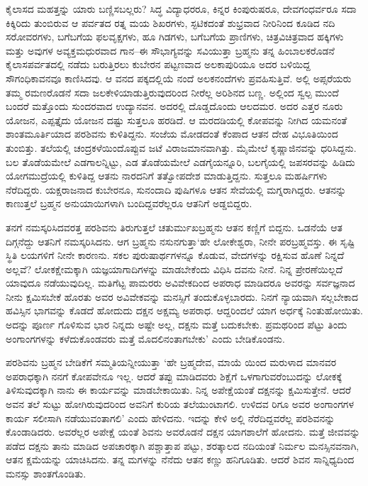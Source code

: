 ಕೈಲಾಸದ ಮಹತ್ತನ್ನು ಯಾರು ಬಣ್ಣಿಸಬಲ್ಲರು? ಸಿದ್ಧ ವಿದ್ಯಾಧರರೂ, ಕಿನ್ನರ ಕಿಂಪುರುಷರೂ, ದೇವಗಂಧರ್ವರೂ ಸದಾ ಕಿಕ್ಕಿರಿದು ತುಂಬಿರುವ ಆ ಪರ್ವತದ ರತ್ನ ಮಯ ಶಿಖರಗಳು, ಸ್ಫಟಿಕದಂತೆ ಶುಭ್ರವಾದ ನೀರಿನಿಂದ ಕೂಡಿದ ನದಿ ಸರೋವರಗಳು, ಬಗೆಬಗೆಯ ಫಲವೃಕ್ಷಗಳು, ಹೂ ಗಿಡಗಳು, ಬಗೆಬಗೆಯ ಪ್ರಾಣಿಗಳು, ಚಿತ್ರವಿಚಿತ್ರವಾದ ಹಕ್ಕಿಗಳು ಮತ್ತು ಅವುಗಳ ಅವ್ಯಕ್ತಮಧುರವಾದ ಗಾನ–ಈ ಸೌಭಾಗ್ಯವನ್ನು ಸವಿಯುತ್ತಾ ಬ್ರಹ್ಮನು ತನ್ನ ಹಿಂಬಾಲಕರೊಡನೆ ಕೈಲಾಸಪರ್ವತದಲ್ಲಿ ನಡೆದು ಬರುತ್ತಿರಲು ಕುಬೇರನ ಪಟ್ಟಣವಾದ ಅಲಕಾಪುರಿಯೂ ಅದರ ಬಳಿಯಿದ್ದ ಸೌಗಂಧಿಕಾವನವೂ ಕಾಣಿಸಿದವು. ಆ ವನದ ಪಕ್ಕದಲ್ಲಿಯೆ ನಂದೆ ಅಲಕನಂದೆಗಳು ಪ್ರವಹಿಸುತ್ತಿವೆ. ಅಲ್ಲಿ ಅಪ್ಸರೆಯರು ತಮ್ಮ ರಮಣರೊಡನೆ ಸದಾ ಜಲಕೇಳಿಯಾಡುತ್ತಿರುವುದರಿಂದ ನೀರೆಲ್ಲ ಅರಿಶಿನದ ಬಣ್ಣ. ಅಲ್ಲಿಂದ ಸ್ವಲ್ಪ ಮುಂದೆ ಬಂದರೆ ಮತ್ತೊಂದು ಸುಂದರವಾದ ಉದ್ಯಾನವನ. ಅದರಲ್ಲಿ ದೊಡ್ಡದೊಂದು ಆಲದಮರ. ಅದರ ಎತ್ತರ ನೂರು ಯೋಜನ, ಎಪ್ಪತ್ತೈದು ಯೋಜನ ದಷ್ಟು ಸುತ್ತಲೂ ಹರಡಿದೆ. ಆ ಮರದಡಿಯಲ್ಲಿ ಕೋಪವನ್ನು ನೀಗಿದ ಯಮನಂತೆ ಶಾಂತಮೂರ್ತಿಯಾದ ಪರಶಿವನು ಕುಳಿತಿದ್ದನು. ಸಂಜೆಯ ಮೋಡದಂತೆ ಕೆಂಪಾದ ಆತನ ದೇಹ ವಿಭೂತಿಯಿಂದ ತುಂಬಿತ್ತು. ತಲೆಯಲ್ಲಿ ಚಂದ್ರಕಳೆಯಿಂದೊಪ್ಪುವ ಜಟೆ ವಿರಾಜಮಾನವಾಗಿತ್ತು. ಮೈಮೇಲೆ ಕೃಷ್ಣಾಜಿನವನ್ನು ಧರಿಸಿದ್ದನು. ಬಲ ತೊಡೆಯಮೇಲೆ ಎಡಗಾಲನ್ನಿಟ್ಟು, ಎಡ ತೊಡೆಯಮೇಲೆ ಎಡಗೈಯನ್ನೂರಿ, ಬಲಗೈಯಲ್ಲಿ ಜಪಸರವನ್ನು ಹಿಡಿದು ಯೋಗಮುದ್ರೆಯಲ್ಲಿ ಕುಳಿತಿದ್ದ ಆತನು ನಾರದನಿಗೆ ತತ್ವೋಪದೇಶ ಮಾಡುತ್ತಿದ್ದನು. ಸುತ್ತಲೂ ಮಹರ್ಷಿಗಳು ನೆರೆದಿದ್ದರು. ಯಕ್ಷರಾಜನಾದ ಕುಬೇರನೂ, ಸುನಂದಾದಿ ಪುಷಿಗಳೂ ಆತನ ಸೇವೆಯಲ್ಲಿ ಮಗ್ನರಾಗಿದ್ದರು. ಆತನನ್ನು ಕಾಣುತ್ತಲೆ ಬ್ರಹ್ಮನ ಅನುಯಾಯಿಗಳಾಗಿ ಬಂದಿದ್ದವರೆಲ್ಲರೂ ಆತನಿಗೆ ಅಡ್ಡಬಿದ್ದರು.

ತನಗೆ ನಮಸ್ಕರಿಸಿದವರತ್ತ ಪರಶಿವನು ತಿರುಗುತ್ತಲೆ ಚತುರ್ಮುಖಬ್ರಹ್ಮನು ಆತನ ಕಣ್ಣಿಗೆ ಬಿದ್ದನು. ಒಡನೆಯೆ ಆತ ದಿಗ್ಗನೆದ್ದು ಆತನಿಗೆ ನಮಸ್ಕರಿಸಿದನು. ಆಗ ಬ್ರಹ್ಮನು ನಸುನಗುತ್ತಾ‘ಹೇ ಲೋಕೇಶ್ವರಾ, ನೀನೇ ಪರಬ್ರಹ್ಮವಸ್ತು. ಈ ಸೃಷ್ಟಿ ಸ್ಥಿತಿ ಲಯಗಳಿಗೆ ನೀನೇ ಕಾರಣನು. ಸಕಲ ಪುರುಷಾರ್ಥಗಳನ್ನೂ ಕೊಡುವ, ವೇದಗಳನ್ನು ರಕ್ಷಿಸುವ ಹೊಣೆ ನಿನ್ನದೆ ಅಲ್ಲವೆ? ಲೋಕಕ್ಷೇಮಕ್ಕಾಗಿ ಯಜ್ಞಯಾಗಾದಿಗಳನ್ನು ಮಾಡಬೇಕೆಂದು ವಿಧಿಸಿ ದವನು ನೀನೆ. ನಿನ್ನ ಪ್ರೇರಣೆಯಿಲ್ಲದೆ ಯಾವುದೂ ನಡೆಯುವುದಿಲ್ಲ. ಮತಿಗೆಟ್ಟ ಪಾಮರರು ಅವಿವೇಕದಿಂದ ಅಪರಾಧ ಮಾಡಿದರೂ ಅವರನ್ನು ಸರ್ವಜ್ಞನಾದ ನೀನು ಕ್ಷಮಿಸಬೇಕೆ ಹೊರತು ಅವರ ಅವಿವೇಕವನ್ನು ಮನಸ್ಸಿಗೆ ತಂದುಕೊಳ್ಳಬಾರದು. ನಿನಗೆ ನ್ಯಾಯವಾಗಿ ಸಲ್ಲಬೇಕಾದ ಹವಿಸ್ಸಿನ ಭಾಗವನ್ನು ಕೊಡದೆ ಹೋದುದು ದಕ್ಷನ ಅಕ್ಷಮ್ಯ ಅಪರಾಧ. ಆದ್ದರಿಂದಲೆ ಯಾಗ ಅರ್ಧಕ್ಕೆ ನಿಂತುಹೋಯಿತು. ಅದನ್ನು ಪೂರ್ಣ ಗೊಳಿಸುವ ಭಾರ ನಿನ್ನದು ಅಷ್ಟೇ ಅಲ್ಲ, ದಕ್ಷನು ಮತ್ತೆ ಬದುಕಬೇಕು. ಪ್ರಮಥರಿಂದ ಪೆಟ್ಟು ತಿಂದು ಅಂಗಾಂಗಗಳನ್ನು ಕಳೆದುಕೊಂಡವರು ಮತ್ತೆ ಮೊದಲಿನಂತಾಗಬೇಕು’ ಎಂದು ಬೇಡಿಕೊಂಡನು.

ಪರಶಿವನು ಬ್ರಹ್ಮನ ಬೇಡಿಕೆಗೆ ಸಮ್ಮತಿಯನ್ನೀಯುತ್ತಾ ‘ಹೇ ಬ್ರಹ್ಮದೇವ, ಮಾಯೆ ಯಿಂದ ಮರುಳಾದ ಮಾನವರ ಅಪರಾಧಕ್ಕಾಗಿ ನನಗೆ ಕೋಪವೇನೂ ಇಲ್ಲ. ಆದರೆ ತಪ್ಪು ಮಾಡಿದವರು ಶಿಕ್ಷೆಗೆ ಒಳಗಾಗುವರೆಂಬುದನ್ನು ಲೋಕಕ್ಕೆ ತಿಳಿಸುವುದಕ್ಕಾಗಿ ನಾನು ಈ ಕಾರ್ಯವನ್ನು ಮಾಡಬೇಕಾಯಿತು. ನಿನ್ನ ಅಪೇಕ್ಷೆಯಂತೆ ದಕ್ಷನನ್ನು ಕ್ಷಮಿಸುತ್ತೇನೆ. ಆದರೆ ಅವನ ತಲೆ ಸುಟ್ಟು ಹೋಗಿರುವುದರಿಂದ ಅವನಿಗೆ ಕುರಿಯ ತಲೆಯುಂಟಾಗಲಿ. ಉಳಿದವ ರಿಗೂ ಅವರ ಅಂಗಾಂಗಗಳ ಕಾರ್ಯ ಸಲೀಸಾಗಿ ನಡೆಯುವಂತಾಗಲಿ’ ಎಂದು ಹೇಳಿದನು. ಇದನ್ನು ಕೇಳಿ ಅಲ್ಲಿ ನೆರೆದಿದ್ದವರೆಲ್ಲ ಪರಶಿವನನ್ನು ಕೊಂಡಾಡಿದರು. ಅವರೆಲ್ಲರ ಅಪೇಕ್ಷೆ ಯಂತೆ ಶಿವನು ಅವರೊಡನೆ ದಕ್ಷನ ಯಾಗಶಾಲೆಗೆ ಹೋದನು. ಮತ್ತೆ ಜೀವವನ್ನು ಪಡೆದ ದಕ್ಷನು ತಾನು ಮಾಡಿದ ಅಪಚಾರಕ್ಕಾಗಿ ಪಶ್ಚಾತ್ತಾಪ ಪಟ್ಟು, ಶರತ್ಕಾಲದ ನದಿಯಂತೆ ನಿರ್ಮಲ ಮನಸ್ಸಿನವನಾಗಿ, ಆತನ ಕ್ಷಮೆಯನ್ನು ಯಾಚಿಸಿದನು. ತನ್ನ ಮಗಳನ್ನು ನೆನೆದು ಆತನ ಕಣ್ಣು ಹನಿಗೂಡಿತು. ಆದರೆ ಶಿವನ ಸಾನ್ನಿಧ್ಯದಿಂದ ಮನಸ್ಸು ಶಾಂತಗೊಂಡಿತು.

